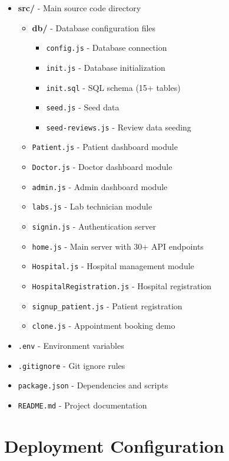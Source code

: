 \begin{itemize}
    \item \textbf{src/} - Main source code directory
    \begin{itemize}
        \item \textbf{db/} - Database configuration files
        \begin{itemize}
            \item \texttt{config.js} - Database connection
            \item \texttt{init.js} - Database initialization
            \item \texttt{init.sql} - SQL schema (15+ tables)
            \item \texttt{seed.js} - Seed data
            \item \texttt{seed-reviews.js} - Review data seeding
        \end{itemize}
        \item \texttt{Patient.js} - Patient dashboard module
        \item \texttt{Doctor.js} - Doctor dashboard module
        \item \texttt{admin.js} - Admin dashboard module
        \item \texttt{labs.js} - Lab technician module
        \item \texttt{signin.js} - Authentication server
        \item \texttt{home.js} - Main server with 30+ API endpoints
        \item \texttt{Hospital.js} - Hospital management module
        \item \texttt{HospitalRegistration.js} - Hospital registration
        \item \texttt{signup\_patient.js} - Patient registration
        \item \texttt{clone.js} - Appointment booking demo
    \end{itemize}
    \item \texttt{.env} - Environment variables
    \item \texttt{.gitignore} - Git ignore rules
    \item \texttt{package.json} - Dependencies and scripts
    \item \texttt{README.md} - Project documentation
\end{itemize}

\section{Deployment Configuration}


